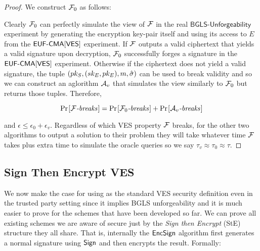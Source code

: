 \begin{proof}
  We construct $\mathcal{F}_0$ as follows:

\begin{center}
\end{center}


Clearly $\mathcal{F}_0$ can perfectly simulate the view of $\mathcal{F}$ in the real $\textsf{BGLS-Unforgeability}$ experiment by generating the encryption key-pair itself and using its access to $E$ from the $\textsf{EUF-CMA}[\textsf{VES}]$ experiment.
If $\mathcal{F}$ outputs a valid ciphertext that yields a valid signature upon decryption, $\mathcal{F}_0$ successfully forges a signature in the $\textsf{EUF-CMA}[\textsf{VES}]$ experiment.
Otherwise if the ciphertext does not yield a valid signature, the tuple $(pk_S,(sk_E, pk_E),m, \hat{\sigma})$ can be used to break validity and so we can construct an aglorithm $\mathcal{A}_v$ that simulates the view similarly to $\mathcal{F}_0$ but returns those tuples. Therefore,

\[  \prob{\textit{$\F$-breaks}} = \prob{\textit{$\F_0$-breaks}} + \prob{\textit{$\adv_v$-breaks}} \]

and $\epsilon \leq \epsilon_0 + \epsilon_v$.
Regardless of which VES property $\mathcal{F}$ breaks, for the other two algorithms to output a solution to their problem they will take whatever time $\mathcal{F}$ takes plus extra time to simulate the oracle queries so we say $\tau_v \approx \tau_0 \approx \tau$.
\end{proof}


\subsection{Sign Then Encrypt VES}

We now make the case for using \EUFCMAVES as the standard VES security definition even in the trusted party setting since it implies BGLS unforgeability and it is much easier to prove for the schemes that have been developed so far.
We can prove all existing schemes we are aware of \cite{Boneh:2003:AVE:1766171.1766207, Ruckert:2009:SVE:1615384.1615387, waters-ves, SHAO20081961, VES-structure-preserving} \EUFCMAVES secure just by the \emph{Sign then Encrypt} (StE) structure they all share.
That is, internally the $\textsf{EncSign}$ algorithm first generates a normal signature using $\textsf{Sign}$ and then encrypts the result. Formally:

